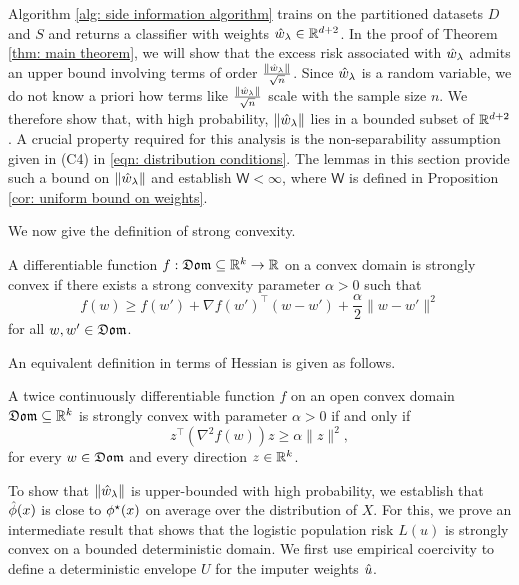 Algorithm \ref{alg: side information algorithm} trains on the partitioned datasets $D$ and $S$ and returns a classifier with weights $\hat{w}_\lambda \in \mathbb{R}^{d+2}$. In the proof of Theorem \ref{thm: main theorem}, we will show that the excess risk associated with $\hat{w}_\lambda$ admits an upper bound involving terms of order $\frac{\lVert \hat{w}_\lambda \rVert}{\sqrt{n}}$. Since $\hat{w}_\lambda$ is a random variable, we do not know a priori how terms like $\frac{\lVert \hat{w}_\lambda \rVert}{\sqrt{n}}$ scale with the sample size $n$. We therefore show that, with high probability, $\lVert \hat{w}_\lambda \rVert$ lies in a bounded subset of $\mathbb{R}^{d+2}$. A crucial property required for this analysis is the non-separability assumption given in (C4) in \eqref{eqn: distribution conditions}. The lemmas in this section provide such a bound on $\lVert \hat{w}_\lambda \rVert$ and establish $\mathsf{W} < \infty$, where $\mathsf{W}$ is defined in Proposition \ref{cor: uniform bound on weights}.


We now give the definition of strong convexity.

\begin{defn}\label{defn: strong convex series}
    A differentiable function $f: \mathfrak{Dom} \subseteq \mathbb{R}^k \rightarrow \mathbb{R}$ on a convex domain is strongly convex if there exists a strong convexity parameter $\alpha > 0$ such that
    \begin{equation*}
        f(w) \geq f(w') + \nabla f(w')^\top (w-w') + \frac{\alpha}{2}\|w-w'\|^2
    \end{equation*}
    for all  $w, w' \in \mathfrak{Dom} $.
\end{defn}
An equivalent definition in terms of Hessian is given as follows.
\begin{defn}\label{defn: strong convex hessian}
    A twice continuously differentiable function $f$ on an open convex domain $\mathfrak{Dom}\subseteq\mathbb{R}^k$ is strongly convex with parameter $\alpha>0$ if and only if
    \begin{equation*}
        z^\top (\nabla^2 f(w)) z \geq \alpha\|z\|^2,
    \end{equation*}
    for every $w\in\mathfrak{Dom}$ and every direction $z\in\mathbb{R}^k$. 
\end{defn}

To show that $\|\hat{w}_\lambda\|$ is upper-bounded with high probability, we establish that $\hat{\phi}(x)$ is close to $\phi^\star(x)$ on average over the distribution of $X$. For this, we prove an intermediate result that shows that the logistic population risk $L(u)$ is strongly convex on a bounded deterministic domain. We first use empirical coercivity to define a deterministic envelope $U$ for the imputer weights $\hat{u}$.

